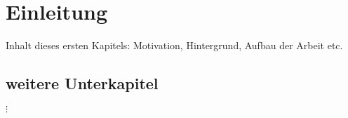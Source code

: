 \chapter{Einleitung}
Inhalt dieses ersten Kapitels: Motivation, Hintergrund, Aufbau der Arbeit etc.



\section{weitere Unterkapitel}

$\vdots$ 